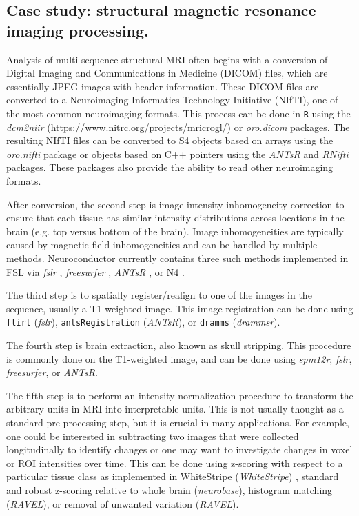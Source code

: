 \documentclass[]{elsarticle} %
\newcommand{\code}[1]{\texttt{#1}}
\newcommand{\pkg}[1]{\emph{#1}}
\begin{document}
\subsection{Case study: structural magnetic resonance imaging processing.} Analysis of multi-sequence structural MRI often begins with a conversion of Digital Imaging and Communications in Medicine (DICOM) files, which are essentially JPEG images with header information.  These DICOM files are converted to a Neuroimaging Informatics Technology Initiative (NIfTI), one of the most common neuroimaging formats. This process can be done in \verb"R" using the \pkg{dcm2niir} (\url{https://www.nitrc.org/projects/mricrogl/}) or \pkg{oro.dicom} \cite{dicom_nifti} packages. The resulting NIfTI files can be converted to S4 objects based on arrays using the \pkg{oro.nifti} \cite{oro.nifti} package or objects based on C++ pointers using the \pkg{ANTsR} \cite{antsr} and \pkg{RNifti} \cite{Rnifti} packages.  These packages also provide the ability to read other neuroimaging formats.

After conversion, the second step is image intensity inhomogeneity correction to ensure that each tissue has similar intensity distributions across locations in the brain (e.g. top versus bottom of the brain). Image inhomogeneities are typically caused by magnetic field inhomogeneities and can be handled by multiple methods. Neuroconductor currently contains three such methods implemented in FSL  via \pkg{fslr} \cite{zhang_segmentation_2001},  \pkg{freesurfer} \cite{sled_nonparametric_1998}, \pkg{ANTsR} \cite{sled_nonparametric_1998}, or N4 \cite{tustison_n4itk:_2010}.  

The third step is to spatially register/realign to one of the images in the sequence, usually a T1-weighted image.  This image registration can be done using \code{flirt} (\pkg{fslr}), \code{antsRegistration} (\pkg{ANTsR}), or \code{dramms} (\pkg{drammsr}).

The fourth step is brain extraction, also known as skull stripping.  This procedure is commonly done on the T1-weighted image, and can be done using \pkg{spm12r}, \pkg{fslr}, \pkg{freesurfer}, or \pkg{ANTsR}.

The fifth step is to perform an intensity normalization procedure to transform the arbitrary units in MRI into interpretable units. This is not usually thought as a standard pre-processing step, but it is crucial in many applications. For example, one could be interested in subtracting two images that were collected longitudinally to identify changes or one may want to investigate changes in voxel or ROI intensities over time.  This can be done using z-scoring with respect to a particular tissue class as implemented in WhiteStripe (\pkg{WhiteStripe}) \citep{whitestripe}, standard and robust z-scoring relative to whole brain (\pkg{neurobase}), histogram matching  (\pkg{RAVEL}), or removal of unwanted variation \citep{ravel} (\pkg{RAVEL}).  
\end{document}
